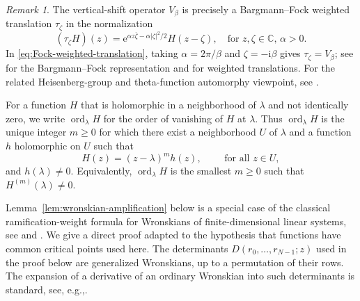 \documentclass[11pt]{amsart}
\numberwithin{equation}{section}
\theoremstyle{definition}
\theoremstyle{remark}
\newtheorem{remark}[theorem]{Remark}
\newcommand{\C}{\mathbb C}
\newcommand{\ii}{\mathrm i}
\newcommand{\e}{\mathrm e}
\newcommand{\ord}{\operatorname{ord}}
\begin{document}
\begin{remark}
    The vertical-shift operator $V_\beta$ is precisely a Bargmann--Fock weighted translation $\tau_\zeta$ in the normalization
    \begin{equation}\label{eq:Fock-weighted-translation}
        (\tau_\zeta H)(z)
        =\e^{\alpha z\overline\zeta-\alpha|\zeta|^2/2}H(z-\zeta),
        \quad \text{for } z, \zeta \in \C, \, \alpha>0. 
    \end{equation}
    In \eqref{eq:Fock-weighted-translation}, taking $\alpha=2\pi/\beta$ and $\zeta=-\ii\beta$ gives $\tau_\zeta=V_\beta$; see \cite[Chapter~1, Section~6]{FollandPhase} for the Bargmann--Fock representation and \cite[Chapter~2]{ZhuFock} for weighted translations. For the related Heisenberg-group and theta-function automorphy viewpoint, see \cite[Chapter~I]{MumfordTheta}.
\end{remark}

For a function $H$ that is holomorphic in a neighborhood of $\lambda$ and not identically zero, we write $\ord_\lambda H$ for the order of vanishing of $H$ at $\lambda$. Thus $\ord_\lambda H$ is the unique integer $m\geq0$ for which there exist a neighborhood $U$ of $\lambda$ and a function $h$ holomorphic on $U$ such that
\begin{equation}
    H(z)=(z-\lambda)^m h(z),
    \qquad \text{ for all } z\in U,
\end{equation}
and $h(\lambda)\neq0$. Equivalently, $\ord_\lambda H$ is the smallest $m\geq0$ such that $H^{(m)}(\lambda)\neq0$.

Lemma~\ref{lem:wronskian-amplification} below is a special case of the classical ramification-weight formula for Wronskians of finite-dimensional linear systems, see \cite[Theorem~15(ii)]{Laksov1984} and \cite[\S3.12]{GattoScherbak2012}. We give a direct proof adapted to the hypothesis that functions have common critical points used here.  The determinants $D(r_0,\ldots,r_{N-1};z)$ used in the proof below are generalized Wronskians, up to a permutation of their rows. The expansion of a derivative of an ordinary Wronskian into such determinants is standard, see, e.g.,\cite[Proposition~1]{Towse2000}.
\end{document}

